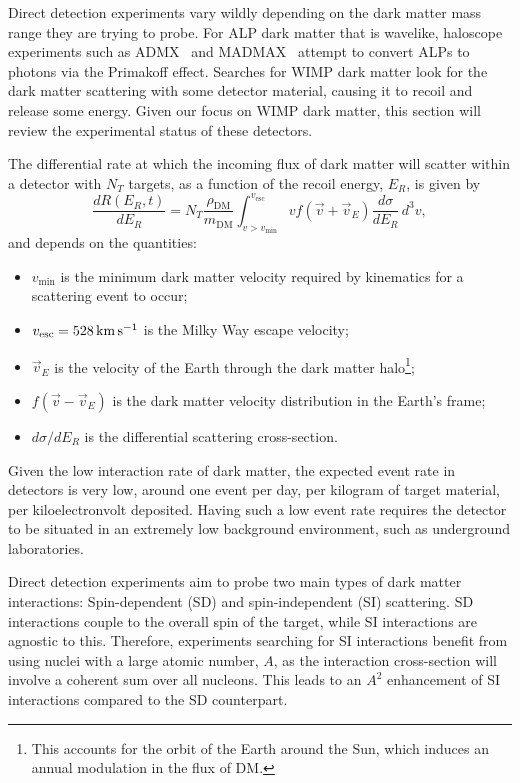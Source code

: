 Direct detection experiments vary wildly depending on the dark matter 
mass range they are trying to probe. For ALP dark matter that is wavelike, haloscope experiments 
such as ADMX~\cite{ADMX:2009iij} and MADMAX~\cite{MADMAX:2019pub_mar_Newexperimentalapproach} 
attempt to convert ALPs to photons via the Primakoff effect. 
Searches for WIMP dark matter look for the dark matter scattering with some detector
material, causing it to recoil and release some energy. Given our focus on WIMP dark matter, 
this section will review the experimental status of these detectors.

The differential rate at which the incoming flux of dark matter will scatter
within a detector with $N_T$ targets, as a function of the recoil energy, $E_R$,
is given by
\begin{equation}
    \frac{d R(E_R, t)}{dE_R} = N_T \frac{\rho_\mathrm{DM}}{m_\mathrm{DM}}\int_{v>v_\mathrm{min}}^{v_\mathrm{esc}}v f(\Vec{v} + \vec{v}_E)\frac{d\sigma}{dE_R}\,d^3v,
\end{equation}
 and depends on the quantities:
\begin{itemize}
    \item $v_\mathrm{min}$ is the minimum dark matter velocity required by kinematics for a scattering event to occur;
    \item $v_\mathrm{esc} = 528{\rm \,km}{\rm \,s}^{-1}$ is the Milky Way escape velocity;
    \item $\vec{v}_E$ is the velocity of the Earth through the dark matter halo\footnote{This accounts for the orbit of the Earth around the Sun, which induces an annual modulation in the flux of DM.};
    \item $f(\vec{v} - \vec{v}_E)$ is the dark matter velocity distribution in the Earth's frame;
    \item $d\sigma/dE_R$ is the differential scattering cross-section.
\end{itemize}
Given the low interaction rate of dark matter, the expected event rate in 
detectors is very low, around one event per day, per kilogram of target material, per kiloelectronvolt deposited.
Having such a low event rate requires the detector to be situated in 
an extremely low background environment, such as underground laboratories. 

Direct detection experiments aim to probe two main types of dark matter interactions:
Spin-dependent (SD) and spin-independent (SI) scattering. SD interactions couple
to the overall spin of the target, while SI interactions are agnostic to this.
Therefore, experiments searching for SI interactions benefit from using nuclei with a large atomic number, $A$,
as the interaction cross-section will involve a coherent sum over all nucleons.
This leads to an $A^2$ enhancement of SI interactions compared to the SD counterpart.

